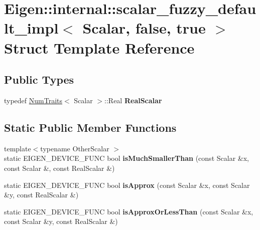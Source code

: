 \hypertarget{struct_eigen_1_1internal_1_1scalar__fuzzy__default__impl_3_01_scalar_00_01false_00_01true_01_4}{}\section{Eigen\+::internal\+::scalar\+\_\+fuzzy\+\_\+default\+\_\+impl$<$ Scalar, false, true $>$ Struct Template Reference}
\label{struct_eigen_1_1internal_1_1scalar__fuzzy__default__impl_3_01_scalar_00_01false_00_01true_01_4}
\subsection*{Public Types}
\begin{DoxyCompactItemize}
\item 
\mbox{\label{struct_eigen_1_1internal_1_1scalar__fuzzy__default__impl_3_01_scalar_00_01false_00_01true_01_4_a560f675905d950f17bcf850c3ad17e84}} 
typedef \mbox{\hyperlink{struct_eigen_1_1_num_traits}{Num\+Traits}}$<$ Scalar $>$\+::Real {\bfseries Real\+Scalar}
\end{DoxyCompactItemize}
\subsection*{Static Public Member Functions}
\begin{DoxyCompactItemize}
\item 
\mbox{\label{struct_eigen_1_1internal_1_1scalar__fuzzy__default__impl_3_01_scalar_00_01false_00_01true_01_4_a3f6981d578ec5831bab06a632cf331ed}} 
{\footnotesize template$<$typename Other\+Scalar $>$ }\\static E\+I\+G\+E\+N\+\_\+\+D\+E\+V\+I\+C\+E\+\_\+\+F\+U\+NC bool {\bfseries is\+Much\+Smaller\+Than} (const Scalar \&x, const Scalar \&, const Real\+Scalar \&)
\item 
\mbox{\label{struct_eigen_1_1internal_1_1scalar__fuzzy__default__impl_3_01_scalar_00_01false_00_01true_01_4_af152f61c9ea1261c1d5bf28b27c9dd47}} 
static E\+I\+G\+E\+N\+\_\+\+D\+E\+V\+I\+C\+E\+\_\+\+F\+U\+NC bool {\bfseries is\+Approx} (const Scalar \&x, const Scalar \&y, const Real\+Scalar \&)
\item 
\mbox{\label{struct_eigen_1_1internal_1_1scalar__fuzzy__default__impl_3_01_scalar_00_01false_00_01true_01_4_acc171a55e09ae5649dcee9a29d085592}} 
static E\+I\+G\+E\+N\+\_\+\+D\+E\+V\+I\+C\+E\+\_\+\+F\+U\+NC bool {\bfseries is\+Approx\+Or\+Less\+Than} (const Scalar \&x, const Scalar \&y, const Real\+Scalar \&)
\end{DoxyCompactItemize}


